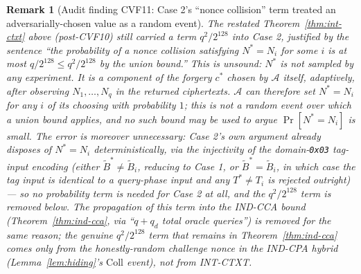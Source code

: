 \documentclass[11pt,a4paper]{article}
\newtheorem{remark}[theorem]{Remark}
\begin{document}
\begin{remark}[Audit finding CVF11: Case 2's ``nonce collision'' term treated an adversarially-chosen value as a random event]
\label{rem:cvf11}
The restated Theorem~\ref{thm:int-ctxt} above (post-CVF10) still carried a
term $q^2/2^{128}$ into Case 2, justified by the sentence ``the probability
of a nonce collision satisfying $N^*=N_i$ for some $i$ is at most
$q/2^{128}\leq q^2/2^{128}$ by the union bound.'' This is unsound: $N^*$ is
not sampled by any experiment. It is a component of the forgery $c^*$ chosen
by $\mathcal{A}$ itself, adaptively, after observing $N_1,\ldots,N_q$ in the
returned ciphertexts. $\mathcal{A}$ can therefore set $N^*=N_i$ for any $i$
of its choosing with probability $1$; this is not a random event over which a
union bound applies, and no such bound may be used to argue $\Pr[N^*=N_i]$
is small. The error is moreover unnecessary: Case 2's own argument already
disposes of $N^*=N_i$ \emph{deterministically}, via the injectivity of the
domain-\texttt{0x03} tag-input encoding (either $\widetilde{B}^*\neq\widetilde{B}_i$,
reducing to Case 1, or $\widetilde{B}^*=\widetilde{B}_i$, in which case the tag
input is identical to a query-phase input and any $T^*\neq T_i$ is rejected
outright) --- so no probability term is needed for Case 2 at all, and the
$q^2/2^{128}$ term is removed below. The propagation of this term into the
IND-CCA bound (Theorem~\ref{thm:ind-cca}, via ``$q+q_d$ total oracle
queries'') is removed for the same reason; the genuine $q^2/2^{128}$ term
that remains in Theorem~\ref{thm:ind-cca} comes only from the honestly-random
challenge nonce in the IND-CPA hybrid (Lemma~\ref{lem:hiding}'s
$\mathrm{Coll}$ event), not from INT-CTXT.
\end{remark}
\end{document}
